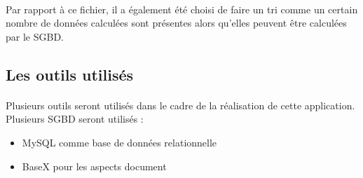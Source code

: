 \paragraph{}Par rapport à ce fichier, il a également été choisi de faire un tri comme un certain nombre de données calculées sont présentes alors qu'elles peuvent être calculées par le SGBD.



\subsection{Les outils utilisés}
\paragraph{}Plusieurs outils seront utilisés dans le cadre de la réalisation de cette application. Plusieurs SGBD seront utilisés :
\begin{itemize}
    \item MySQL comme base de données relationnelle
    \item BaseX pour les aspects document
\end{itemize}


